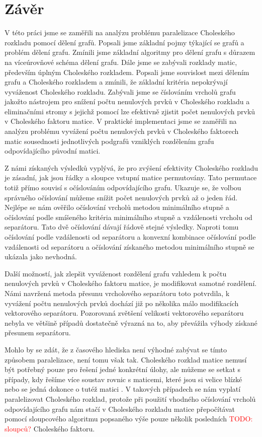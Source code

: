 \documentclass{ctuthesis}
\theoremstyle{plain}
\theoremstyle{definition}
\newcommand{\TODO}[1]{\textcolor{red}{TODO: #1}\PackageWarning{TODO:}{TODO: #1!}}
\begin{document}

\chapter*{Závěr}

V této práci jsme se zaměřili na analýzu problému paralelizace Choleského rozkladu pomocí dělení grafů. Popsali jsme základní pojmy týkající se grafů a problém dělení grafu. Zmínili jsme základní algoritmy pro dělení grafu s důrazem na víceúrovňové schéma dělení grafu. Dále jsme se zabývali rozklady matic, především úplným Choleského rozkladem. Popsali jsme souvislost mezi dělením grafu a Choleského rozkladem a zmínili, že základní kritéria nepokrývají vyváženost Choleského rozkladu. Zabývali jsme se číslováním vrcholů grafu jakožto nástrojem pro snížení počtu nenulových prvků v Choleského rozkladu a eliminačními stromy s jejichž pomocí lze efektivně zjistit počet nenulových prvků v Choleského faktoru matice. V praktické implementaci jsme se zaměřili na analýzu problému vyvážení počtu nenulových prvků v Choleského faktorech matic sousednosti jednotlivých podgrafů vzniklých rozdělením grafu odpovídajícího původní matici.

Z námi získaných výsledků vyplývá, že pro zvýšení efektivity Choleského rozkladu je zásadní, jak jsou řádky a sloupce vstupní matice permutovány. Tato permutace totiž přímo souvisí s očíslováním odpovídajícího grafu. Ukazuje se, že volbou správného očíslování můžeme snížit počet nenulových prvků až o jeden řád. Nejlépe se nám ověřilo očíslování vrcholů metodou minimálního stupně a očíslování podle smíšeného kritéria minimálního stupně a vzdálenosti vrcholu od separátoru. Tato dvě očíslování dávají řádově stejné výsledky. Naproti tomu očíslování podle vzdálenosti od separátoru a konvexní kombinace očíslování podle vzdálenosti od separátoru a očíslování získaného metodou minimálního stupně se ukázala jako nevhodná.

Další možností, jak zlepšit vyváženost rozdělení grafu vzhledem k počtu nenulových prvků v Choleského faktoru matice, je modifikovat samotné rozdělení. Námi navržená metoda přesunu vrcholového separátoru toto potvrdila, k vyvážení počtu nenulových prvků dochází již po několika málo modifikacích vektorového separátoru. Pozorovaná zvětšení velikosti vektorového separátoru nebyla ve většině případů dostatečně výrazná na to, aby převážila výhody získané přesunem separátoru.

Mohlo by se zdát, že z časového hlediska není výhodné zabývat se tímto způsobem paralelizace, není tomu však tak. Choleského rozklad matice nemusí být potřebný pouze pro řešení jedné konkrétní úlohy, ale můžeme se setkat s případy, kdy řešíme více soustav rovnic s maticemi, které jsou si velice blízké nebo se jedná dokonce o tutéž matici \cite{dutu:10}. V takových případech se nám vyplatí paralelizovat Choleského rozklad, protože při použití vhodného očíslování vrcholů odpovídajícího grafu nám stačí v Choleského rozkladu matice přepočítávat pomocí sloupcového algoritmu popsaného výše pouze několik posledních \TODO{sloupců?} Choleského faktoru. 
\end{document}
